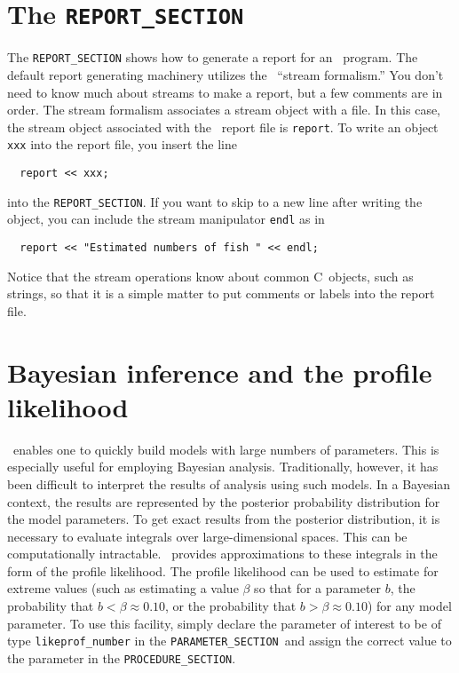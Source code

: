 \documentclass{admbmanual}
\newcommand\PS{\texttt{PARAMETER\_SECTION}}
\newcommand\PROS{\texttt{PROCEDURE\_SECTION}}
\newcommand\apl{profile likelihood}
\begin{document}
\section{The \texttt{REPORT\_SECTION}}

The \texttt{REPORT\_SECTION} shows how to generate a report for an \ADM\
program. The default report generating machinery utilizes the \cplus\ ``stream
formalism.'' You don't need to know much about streams to make a report, but a
few comments are in order. The stream formalism associates a stream object with
a file. In this case, the stream object associated with the \ADM\ report file is
\texttt{report}. To write an object \texttt{xxx} into the report file, you
insert the line
\begin{lstlisting}
  report << xxx;
\end{lstlisting}
into the \texttt{REPORT\_SECTION}. If you want to skip to a new line after
writing the object, you can include the stream manipulator \texttt{endl} as in
\begin{lstlisting}
  report << "Estimated numbers of fish " << endl;
\end{lstlisting}
Notice that the stream operations know about common C~objects, such as strings,
so that it is a simple matter to put comments or labels into the report file.
\X{endl@\texttt{endl} stream manipulator}

\section{Bayesian inference and the \apl}\label{sec:bayesian-inference}

\ADM\ enables one to quickly build models with large numbers of parameters. This
is especially useful for employing Bayesian analysis. Traditionally, however, it
has been difficult to interpret the results of analysis using such models. In a
Bayesian context, the results are represented by the posterior probability
distribution for the model parameters. To get exact results from the posterior
distribution, it is necessary to evaluate integrals over large-dimensional
spaces. This can be computationally intractable. \ADM\ provides approximations
to these integrals in the form of the profile likelihood. The profile likelihood
can be used to estimate for extreme values (such as estimating a value $\beta$
so that for a parameter $b$, the probability that $b<\beta \approx 0.10$, or the
probability that $b>\beta \approx 0.10$) for any model parameter. To use this
facility, simply declare the parameter of interest to be of type
\texttt{likeprof\_number} in the \PS\ and assign the correct value to the
parameter in the \PROS.
\end{document}
